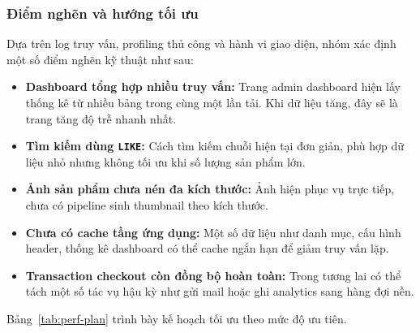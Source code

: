 \documentclass[11pt, a4paper]{article}
\begin{document}
\subsubsection{Điểm nghẽn và hướng tối ưu}

Dựa trên log truy vấn, profiling thủ công và hành vi giao diện, nhóm xác định
một số điểm nghẽn kỹ thuật như sau:

\begin{itemize}[leftmargin=*]
    \item \textbf{Dashboard tổng hợp nhiều truy vấn:} Trang admin dashboard
          hiện lấy thống kê từ nhiều bảng trong cùng một lần tải. Khi dữ liệu tăng,
          đây sẽ là trang tăng độ trễ nhanh nhất.
    \item \textbf{Tìm kiếm dùng \texttt{LIKE}:} Cách tìm kiếm chuỗi hiện tại
          đơn giản, phù hợp dữ liệu nhỏ nhưng không tối ưu khi số lượng sản phẩm lớn.
    \item \textbf{Ảnh sản phẩm chưa nén đa kích thước:} Ảnh hiện phục vụ trực tiếp,
          chưa có pipeline sinh thumbnail theo kích thước.
    \item \textbf{Chưa có cache tầng ứng dụng:} Một số dữ liệu như danh mục, cấu hình
          header, thống kê dashboard có thể cache ngắn hạn để giảm truy vấn lặp.
    \item \textbf{Transaction checkout còn đồng bộ hoàn toàn:} Trong tương lai có thể
          tách một số tác vụ hậu kỳ như gửi mail hoặc ghi analytics sang hàng đợi nền.
\end{itemize}

Bảng~\ref{tab:perf-plan} trình bày kế hoạch tối ưu theo mức độ ưu tiên.
\end{document}
